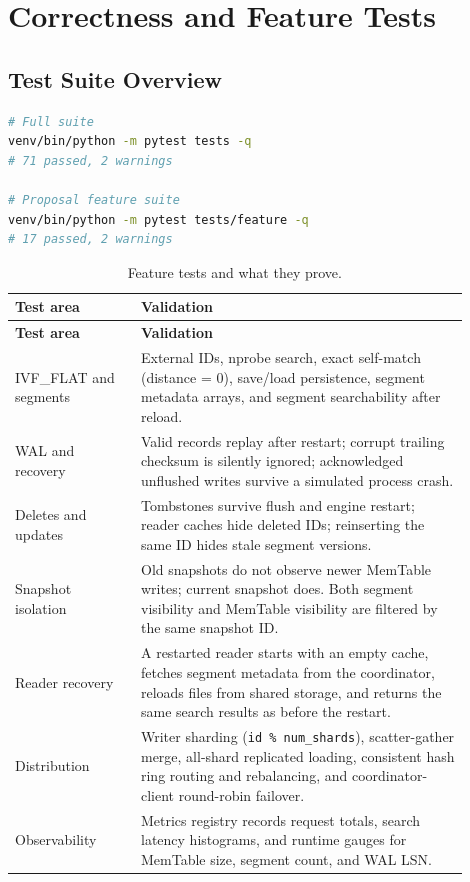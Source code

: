 \documentclass[11pt,a4paper]{article}
\begin{document}
\section{Correctness and Feature Tests}

\subsection{Test Suite Overview}

\begin{lstlisting}[language=bash, caption={Full and feature-only test suites.}]
# Full suite
venv/bin/python -m pytest tests -q
# 71 passed, 2 warnings

# Proposal feature suite
venv/bin/python -m pytest tests/feature -q
# 17 passed, 2 warnings
\end{lstlisting}

\begin{longtable}{p{0.25\linewidth} p{0.65\linewidth}}
\caption{Feature tests and what they prove.}\\
\toprule
\textbf{Test area} & \textbf{Validation} \\
\midrule
\endfirsthead
\toprule
\textbf{Test area} & \textbf{Validation} \\
\midrule
\endhead
IVF\_FLAT and segments &
  External IDs, nprobe search, exact self-match (distance = 0), save/load
  persistence, segment metadata arrays, and segment searchability after
  reload. \\
\midrule
WAL and recovery &
  Valid records replay after restart; corrupt trailing checksum is
  silently ignored; acknowledged unflushed writes survive a simulated
  process crash. \\
\midrule
Deletes and updates &
  Tombstones survive flush and engine restart; reader caches hide deleted
  IDs; reinserting the same ID hides stale segment versions. \\
\midrule
Snapshot isolation &
  Old snapshots do not observe newer MemTable writes; current snapshot
  does. Both segment visibility and MemTable visibility are filtered by
  the same snapshot ID. \\
\midrule
Reader recovery &
  A restarted reader starts with an empty cache, fetches segment metadata
  from the coordinator, reloads files from shared storage, and returns
  the same search results as before the restart. \\
\midrule
Distribution &
  Writer sharding (\texttt{id \% num\_shards}), scatter-gather merge,
  all-shard replicated loading, consistent hash ring routing and
  rebalancing, and coordinator-client round-robin failover. \\
\midrule
Observability &
  Metrics registry records request totals, search latency histograms,
  and runtime gauges for MemTable size, segment count, and WAL LSN. \\
\bottomrule
\end{longtable}
\end{document}
